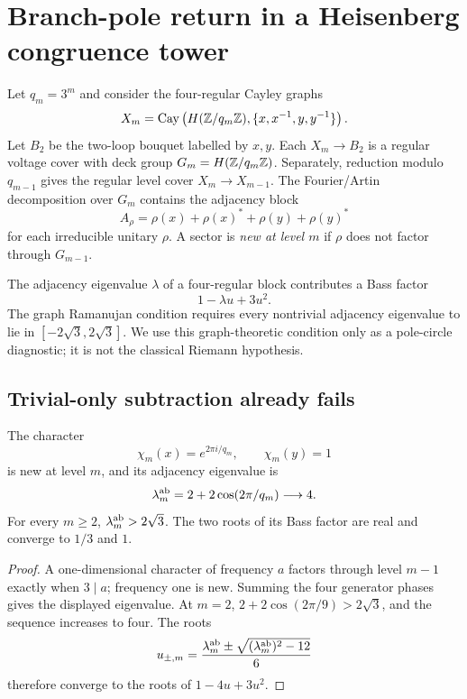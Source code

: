 \section{Branch-pole return in a Heisenberg congruence tower}
\label{sec:tower}

Let \(q_m=3^m\) and consider the four-regular Cayley graphs
\[
X_m=
\operatorname{Cay}\left(
H(\mathbb{Z}/q_m\mathbb{Z}),\{x,x^{-1},y,y^{-1}\}\right).
\]
Let \(B_2\) be the two-loop bouquet labelled by \(x,y\). Each
\(X_m\to B_2\) is a regular voltage cover with deck group
\(G_m=H(\mathbb{Z}/q_m\mathbb{Z})\). Separately, reduction modulo \(q_{m-1}\) gives the
regular level cover \(X_m\to X_{m-1}\). The Fourier/Artin decomposition over
\(G_m\) contains the adjacency block
\[
A_\rho=\rho(x)+\rho(x)^*+\rho(y)+\rho(y)^*
\]
for each irreducible unitary \(\rho\). A sector is \emph{new at level \(m\)}
if \(\rho\) does not factor through \(G_{m-1}\).

The adjacency eigenvalue \(\lambda\) of a four-regular block contributes a
Bass factor
\[
1-\lambda u+3u^2.
\]
The graph Ramanujan condition requires every nontrivial adjacency eigenvalue
to lie in \([-2\sqrt3,2\sqrt3]\). We use this graph-theoretic condition only
as a pole-circle diagnostic; it is not the classical Riemann hypothesis.

\subsection{Trivial-only subtraction already fails}

\begin{proposition}
\label{prop:abelian-tower}
The character
\[
\chi_m(x)=e^{2\pi i/q_m},\qquad \chi_m(y)=1
\]
is new at level \(m\), and its adjacency eigenvalue is
\[
\lambda_m^{\rm ab}=2+2\cos(2\pi/q_m)\longrightarrow4.
\]
For every \(m\ge2\), \(\lambda_m^{\rm ab}>2\sqrt3\). The two roots of its
Bass factor are real and converge to \(1/3\) and \(1\).
\end{proposition}

\begin{proof}
A one-dimensional character of frequency \(a\) factors through level
\(m-1\) exactly when \(3\mid a\); frequency one is new. Summing the four
generator phases gives the displayed eigenvalue. At \(m=2\),
\(2+2\cos(2\pi/9)>2\sqrt3\), and the sequence increases to four. The roots
\[
u_{\pm,m}=
\frac{\lambda_m^{\rm ab}
\pm\sqrt{(\lambda_m^{\rm ab})^2-12}}{6}
\]
therefore converge to the roots of \(1-4u+3u^2\).
\end{proof}

